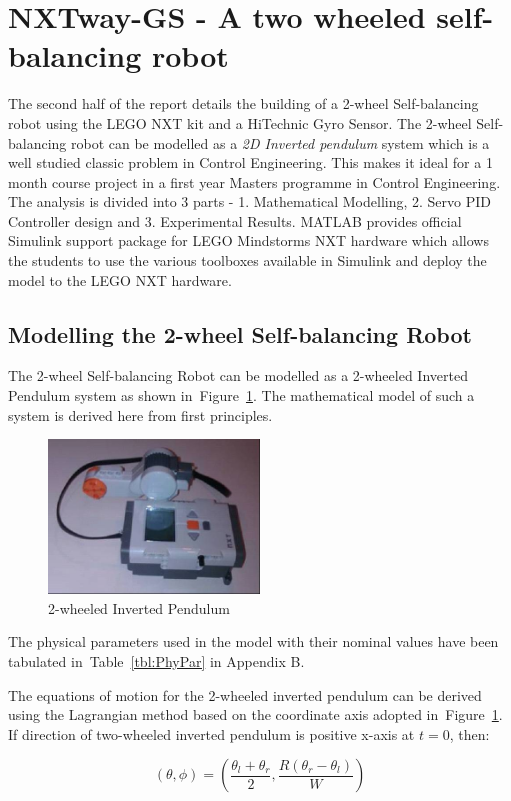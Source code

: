 \documentclass[paper=a4, fontsize=11pt]{scrartcl}
\numberwithin{equation}{section}        %
\numberwithin{figure}{section}          %
\numberwithin{table}{section}           %
\begin{document}
\section{NXTway-GS - A two wheeled self-balancing robot}
The second half of the report details the building of a 2-wheel Self-balancing robot using the LEGO NXT kit and a HiTechnic Gyro Sensor. The 2-wheel Self-balancing robot can be modelled as a \emph{2D Inverted pendulum} system which is a well studied classic problem in Control Engineering. This makes it ideal for a 1 month course project in a first year Masters programme in Control Engineering. The analysis is divided into 3 parts - 1. Mathematical Modelling, 2. Servo PID Controller design and 3. Experimental Results. MATLAB provides official Simulink support package for LEGO Mindstorms NXT hardware which allows the students to use the various toolboxes available in Simulink and deploy the model to the LEGO NXT hardware.

\subsection{Modelling the 2-wheel Self-balancing Robot}
The 2-wheel Self-balancing Robot can be modelled as a 2-wheeled Inverted Pendulum system as shown in~Figure~\ref{fig:InvPen}. The mathematical model of such a system is derived here from first principles. 
\begin{figure}[!hbp]
	\includegraphics[width=0.5\textwidth]{InvPen}
	\caption{2-wheeled Inverted Pendulum}
	\label{fig:InvPen}
\end{figure}
The physical parameters used in the model with their nominal values have been tabulated in~Table~\ref{tbl:PhyPar} in Appendix B.

The equations of motion for the 2-wheeled inverted pendulum can be derived using the Lagrangian method based on the coordinate axis adopted in~Figure~\ref{fig:InvPen}. If direction of two-wheeled inverted pendulum is positive x-axis at $t=0$, then:

\begin{equation}
(\theta,\phi) = (\frac{\theta{}_{l}+\theta{}_{r}}{2},\frac{R(\theta{}_{r}-\theta{}_{l})}{W})
\end{equation}
\end{document}
